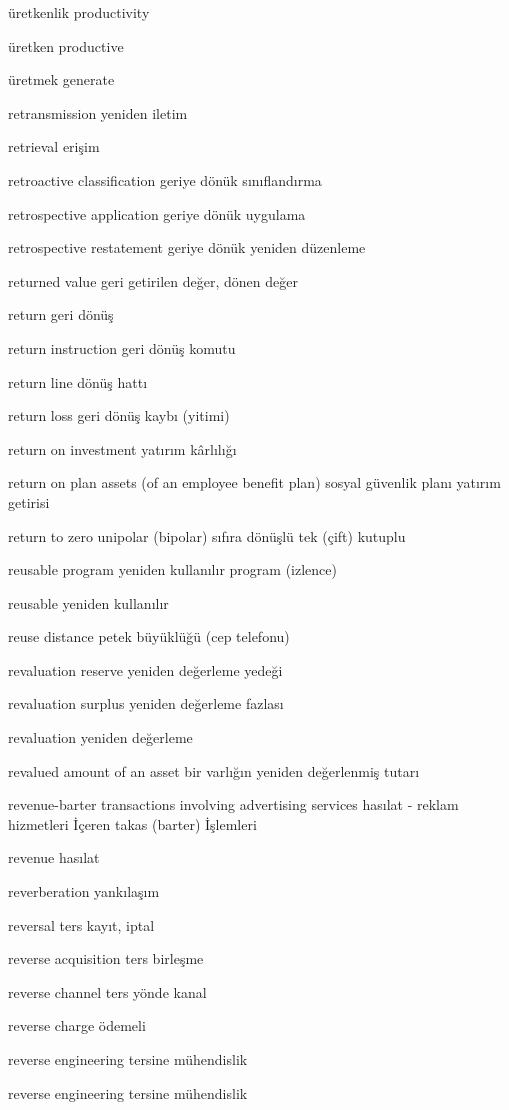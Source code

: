 \documentclass[12pt,fleqn]{article}\usepackage{../../common}
\begin{document}
üretkenlik productivity

üretken productive

üretmek generate

retransmission yeniden iletim

retrieval erişim

retroactive classification geriye dönük sınıflandırma

retrospective application geriye dönük uygulama

retrospective restatement geriye dönük yeniden düzenleme 

returned value geri getirilen değer, dönen değer

return geri dönüş

return instruction geri dönüş komutu

return line dönüş hattı

return loss geri dönüş kaybı (yitimi)

return on investment yatırım kârlılığı

return on plan assets (of an employee benefit plan) sosyal güvenlik planı yatırım getirisi

return to zero unipolar (bipolar) sıfıra dönüşlü tek (çift) kutuplu

reusable program yeniden kullanılır program (izlence)

reusable yeniden kullanılır

reuse distance petek büyüklüğü (cep telefonu)

revaluation reserve yeniden değerleme yedeği

revaluation surplus yeniden değerleme fazlası

revaluation yeniden değerleme

revalued amount of an asset bir varlığın yeniden değerlenmiş tutarı

revenue-barter transactions involving advertising services hasılat - reklam hizmetleri İçeren takas (barter) İşlemleri

revenue hasılat

reverberation yankılaşım

reversal ters kayıt, iptal

reverse acquisition ters birleşme

reverse channel ters yönde kanal

reverse charge ödemeli

reverse engineering tersine mühendislik

reverse engineering tersine mühendislik
\end{document}
